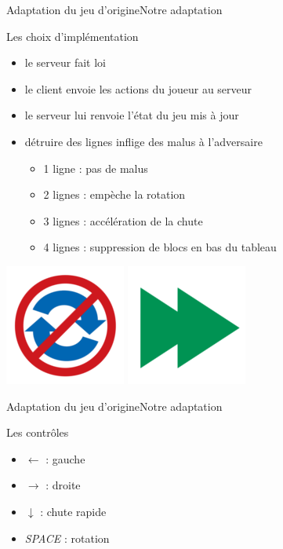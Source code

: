 \documentclass[french]{beamer}
\begin{document}
\begin{frame}{Adaptation du jeu d'origine}{Notre adaptation}
	
	\begin{block}{Les choix d'implémentation}
		\begin{itemize}
			\item le serveur fait loi
			\item le client envoie les actions du joueur au serveur
			\item le serveur lui renvoie l'état du jeu mis à jour
			\item détruire des lignes inflige des malus à l'adversaire
			\begin{itemize}
				\item 1 ligne : pas de malus
				\item 2 lignes : empèche la rotation
				\item 3 lignes : accélération de la chute
				\item 4 lignes : suppression de blocs en bas du tableau
			\end{itemize}
		\end{itemize}
	\end{block}

	\begin{center}
		\includegraphics[scale=0.2]{../ressources/malusNoRotate.png}
		\includegraphics[scale=0.2]{../ressources/malusSpeed.png}
	\end{center}

\end{frame}

\begin{frame}{Adaptation du jeu d'origine}{Notre adaptation}
	\begin{block}{Les contrôles}
		\begin{itemize}
			\item $\gets$ : gauche
			\item $\to$ : droite
			\item $\downarrow$ : chute rapide
			\item \emph{SPACE} : rotation
		\end{itemize}
	\end{block}

\end{frame}
\end{document}
